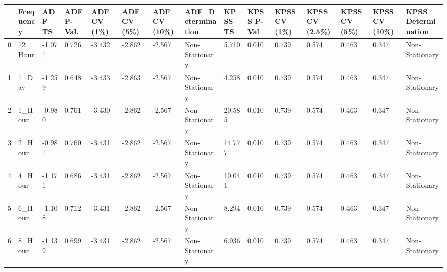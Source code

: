 \begin{tabular}{lllllllllllllll}
\toprule
 & Frequency & ADF TS & ADF P-Val. & ADF CV (1\%) & ADF CV (5\%) & ADF CV (10\%) & ADF_Determination & KPSS TS & KPSS P-Val & KPSS CV (1\%) & KPSS CV (2.5\%) & KPSS CV (5\%) & KPSS CV (10\%) & KPSS_Determination \\
\midrule
0 & 12_Hour & -1.071 & 0.726 & -3.432 & -2.862 & -2.567 & Non-Stationary & 5.710 & 0.010 & 0.739 & 0.574 & 0.463 & 0.347 & Non-Stationary \\
1 & 1_Day & -1.259 & 0.648 & -3.433 & -2.863 & -2.567 & Non-Stationary & 4.258 & 0.010 & 0.739 & 0.574 & 0.463 & 0.347 & Non-Stationary \\
2 & 1_Hour & -0.980 & 0.761 & -3.430 & -2.862 & -2.567 & Non-Stationary & 20.585 & 0.010 & 0.739 & 0.574 & 0.463 & 0.347 & Non-Stationary \\
3 & 2_Hour & -0.981 & 0.760 & -3.431 & -2.862 & -2.567 & Non-Stationary & 14.777 & 0.010 & 0.739 & 0.574 & 0.463 & 0.347 & Non-Stationary \\
4 & 4_Hour & -1.171 & 0.686 & -3.431 & -2.862 & -2.567 & Non-Stationary & 10.041 & 0.010 & 0.739 & 0.574 & 0.463 & 0.347 & Non-Stationary \\
5 & 6_Hour & -1.108 & 0.712 & -3.431 & -2.862 & -2.567 & Non-Stationary & 8.294 & 0.010 & 0.739 & 0.574 & 0.463 & 0.347 & Non-Stationary \\
6 & 8_Hour & -1.139 & 0.699 & -3.431 & -2.862 & -2.567 & Non-Stationary & 6.936 & 0.010 & 0.739 & 0.574 & 0.463 & 0.347 & Non-Stationary \\
\bottomrule
\end{tabular}
